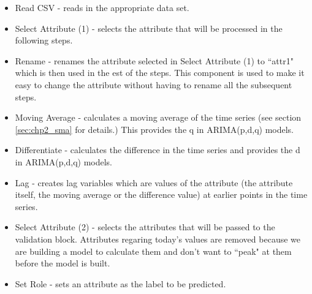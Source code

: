 \begin{itemize}
\item Read CSV - reads in the appropriate data set.
\item Select Attribute (1) - selects the attribute that will be processed in the following steps.
\item Rename - renames the attribute selected in Select Attribute (1) to \textquotedblleft attr1" which is then used in the est of the steps. This component is used to make it easy to change the attribute without having to rename all the subsequent steps.
\item Moving Average - calculates a moving average of the time series (see section \ref{sec:chp2_sma} for details.) This provides the q in ARIMA(p,d,q) models.
\item Differentiate - calculates the difference in the time series and provides the d in ARIMA(p,d,q) models.
\item Lag - creates lag variables which are values of the attribute (the attribute itself, the moving average or the difference value) at earlier points in the time series.
\item Select Attribute (2) - selects the attributes that will be passed to the validation block. Attributes regaring today's values are removed because we are building a model to calculate them and don't want to \textquotedblleft peak" at them before the model is built.
\item Set Role - sets an attribute as the label to be predicted.

\end{itemize}

